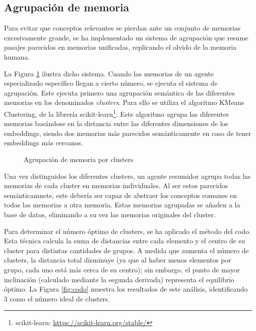 \subsection{Agrupación de memoria}
Para evitar que conceptos relevantes se pierdan ante un conjunto de memorias excesivamente grande, se ha implementado un sistema de agrupación que resume pasajes parecidos en memorias unificadas, replicando el olvido de la memoria humana. 

La Figura \ref{fig:mem_2} ilustra dicho sistema. Cuando las memorias de un agente especializado específico llegan a cierto número, se ejecuta el sistema de agrupación. Este ejecuta primero una agrupación semántica de las diferentes memorias en los denominados \textit{clusters}. Para ello se utiliza el algoritmo KMeans Clustering, de la librería scikit-learn\footnote{scikit-learn: \url{https://scikit-learn.org/stable/}}. Este algoritmo agrupa las diferentes memorias basándose en la distancia entre las diferentes dimensiones de los embeddings, siendo dos memorias más parecidos semánticamente en caso de tener embeddings más cercanos. 

\begin{figure}[h]
\centering
{}
\caption{Agrupación de memoria por clusters}
\label{fig:mem_2}
\end{figure}

Una vez distinguidos los diferentes clusters, un agente resumidor agrupa todas las memorias de cada cluster en memorias individuales. Al ser estos parecidos semánticamnete, este debería ser capaz de abstraer los conceptos comunes en todas las memorias a otra memoria. Estas memorias agrupadas se añaden a la base de datos, eliminando a su vez las memorias originales del cluster. 

Para determinar el número óptimo de clusters, se ha aplicado el método del codo. Esta técnica calcula la suma de distancias entre cada elemento y el centro de su cluster para distintas cantidades de grupos. A medida que aumenta el número de clusters, la distancia total disminuye (ya que al haber menos elementos por grupo, cada uno está más cerca de su centro); sin embargo, el punto de mayor inclinación (calculado mediante la segunda derivada) representa el equilibrio óptimo. La Figura \ref{fig:codo} muestra los resultados de este análisis, identificando 3 como el número ideal de clusters.

